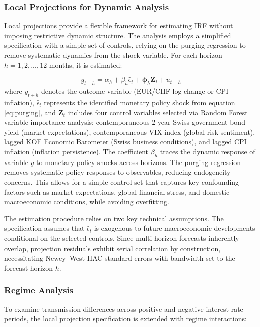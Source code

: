 \documentclass[12pt,a4paper]{article}
\begin{document}
\subsubsection{Local Projections for Dynamic Analysis}

Local projections \citep{jorda2005} provide a flexible framework for estimating IRF without imposing restrictive dynamic structure. The analysis employs a simplified specification with a simple set of controls, relying on the purging regression to remove systematic dynamics from the shock variable. For each horizon $h = 1, 2, ..., 12$ months, it is estimated:

\begin{equation}
	y_{t+h} = \alpha_h + \beta_h \hat{\epsilon}_t + \mathbf{\phi}_h \mathbf{Z}_t + u_{t+h}
	\label{eq:local_projections}
\end{equation}
where $y_{t+h}$ denotes the outcome variable (EUR/CHF log change or CPI inflation), $\hat{\epsilon}_t$ represents the identified monetary policy shock from equation \eqref{eq:purging}, and $\mathbf{Z}_t$ includes four control variables selected via Random Forest variable importance analysis: contemporaneous 2-year Swiss government bond yield (market expectations), contemporaneous VIX index (global risk sentiment), lagged KOF Economic Barometer (Swiss business conditions), and lagged CPI inflation (inflation persistence). The coefficient $\beta_h$ traces the dynamic response of variable $y$ to monetary policy shocks across horizons. The purging regression removes systematic policy responses to observables, reducing endogeneity concerns. This allows for a simple control set that captures key confounding factors such as market expectations, global financial stress, and domestic macroeconomic conditions, while avoiding overfitting.

The estimation procedure relies on two key technical assumptions. The specification assumes that $\hat{\epsilon}_t$ is exogenous to future macroeconomic developments conditional on the selected controls. Since multi-horizon forecasts inherently overlap, projection residuals exhibit serial correlation by construction, necessitating Newey--West HAC standard errors with bandwidth set to the forecast horizon $h$.
\newpage

\subsubsection{Regime Analysis}

To examine transmission differences across positive and negative interest rate periods, the local projection specification is extended with regime interactions:
\end{document}
